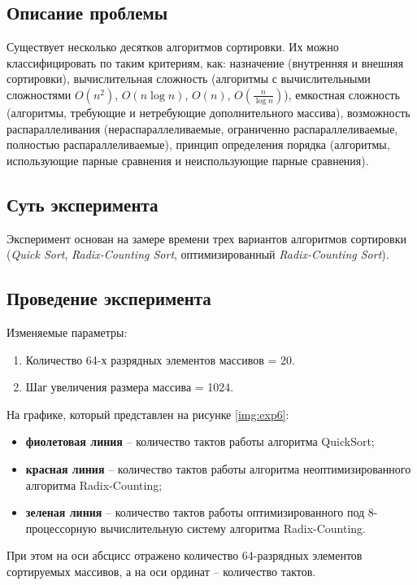 \subsection{Описание проблемы}
Существует несколько десятков алгоритмов сортировки. Их можно классифицировать
по таким критериям, как: назначение (внутренняя и внешняя сортировки),
вычислительная сложность (алгоритмы с вычислительными сложностями $O(n^2)$,
$O(n \log n)$, $O(n)$, $O(\frac{n}{\log n})$), емкостная сложность (алгоритмы,
требующие и нетребующие дополнительного массива), возможность распараллеливания
(нераспараллеливаемые, ограниченно распараллеливаемые, полностью
распараллеливаемые), принцип определения порядка (алгоритмы, использующие
парные сравнения и неиспользующие парные сравнения).

\subsection{Суть эксперимента}  
Эксперимент основан на замере времени трех вариантов алгоритмов сортировки
(\textit{Quick Sort}, \textit{Radix-Counting Sort}, оптимизированный
\textit{Radix-Counting Sort}).

\subsection{Проведение эксперимента}

Изменяемые параметры:
\begin{enumerate}
	\item Количество 64-х разрядных элементов массивов = 20.
	\item Шаг увеличения размера массива = 1024.
\end{enumerate}

На графике, который представлен на рисунке \ref{img:exp6}:
\begin{itemize}
    \item \textbf{фиолетовая линия} -- количество тактов работы алгоритма
        QuickSort;
    \item \textbf{красная линия} -- количество тактов работы алгоритма
        неоптимизированного алгоритма Radix-Counting;
    \item \textbf{зеленая линия} -- количество тактов работы оптимизированного
        под 8-процессорную вычислительную систему алгоритма Radix-Counting.
\end{itemize}

При этом на оси абсцисс отражено количество 64-разрядных элементов сортируемых
массивов, а на оси ординат -- количество тактов.

